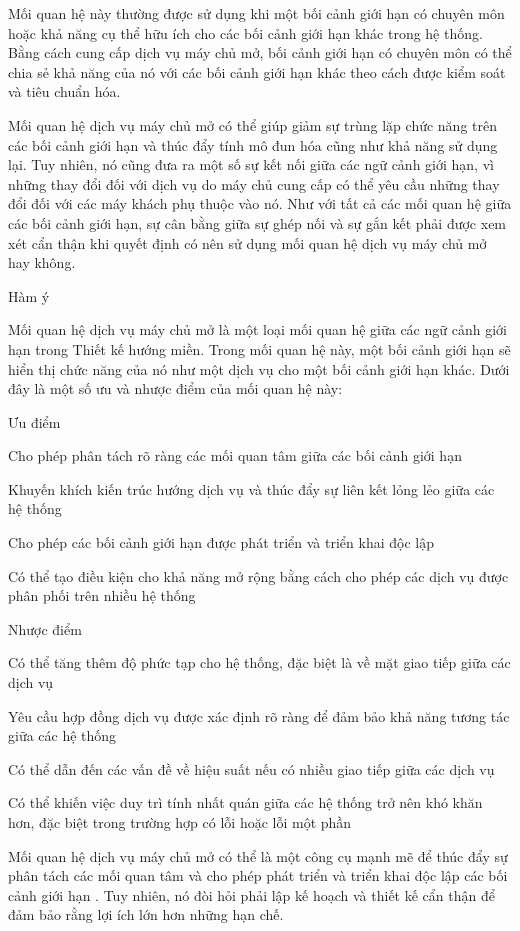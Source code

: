 Mối quan hệ này thường được sử dụng khi một bối cảnh giới hạn có chuyên môn hoặc khả năng cụ thể hữu ích cho các bối cảnh giới hạn khác trong hệ thống. Bằng cách cung cấp dịch vụ máy chủ mở, bối cảnh giới hạn có chuyên môn có thể chia sẻ khả năng của nó với các bối cảnh giới hạn khác theo cách được kiểm soát và tiêu chuẩn hóa.

Mối quan hệ dịch vụ máy chủ mở có thể giúp giảm sự trùng lặp chức năng trên các bối cảnh giới hạn và thúc đẩy tính mô đun hóa cũng như khả năng sử dụng lại. Tuy nhiên, nó cũng đưa ra một số sự kết nối giữa các ngữ cảnh giới hạn, vì những thay đổi đối với dịch vụ do máy chủ cung cấp có thể yêu cầu những thay đổi đối với các máy khách phụ thuộc vào nó. Như với tất cả các mối quan hệ giữa các bối cảnh giới hạn, sự cân bằng giữa sự ghép nối và sự gắn kết phải được xem xét cẩn thận khi quyết định có nên sử dụng mối quan hệ dịch vụ máy chủ mở hay không.

Hàm ý

Mối quan hệ dịch vụ máy chủ mở là một loại mối quan hệ giữa các ngữ cảnh giới hạn trong Thiết kế hướng miền. Trong mối quan hệ này, một bối cảnh giới hạn sẽ hiển thị chức năng của nó như một dịch vụ cho một bối cảnh giới hạn khác. Dưới đây là một số ưu và nhược điểm của mối quan hệ này:

Ưu điểm

Cho phép phân tách rõ ràng các mối quan tâm giữa các bối cảnh giới hạn

Khuyến khích kiến trúc hướng dịch vụ và thúc đẩy sự liên kết lỏng lẻo giữa các hệ thống

Cho phép các bối cảnh giới hạn được phát triển và triển khai độc lập

Có thể tạo điều kiện cho khả năng mở rộng bằng cách cho phép các dịch vụ được phân phối trên nhiều hệ thống

Nhược điểm

Có thể tăng thêm độ phức tạp cho hệ thống, đặc biệt là về mặt giao tiếp giữa các dịch vụ

Yêu cầu hợp đồng dịch vụ được xác định rõ ràng để đảm bảo khả năng tương tác giữa các hệ thống

Có thể dẫn đến các vấn đề về hiệu suất nếu có nhiều giao tiếp giữa các dịch vụ

Có thể khiến việc duy trì tính nhất quán giữa các hệ thống trở nên khó khăn hơn, đặc biệt trong trường hợp có lỗi hoặc lỗi một phần

Mối quan hệ dịch vụ máy chủ mở có thể là một công cụ mạnh mẽ để thúc đẩy sự phân tách các mối quan tâm và cho phép phát triển và triển khai độc lập các bối cảnh giới hạn . Tuy nhiên, nó đòi hỏi phải lập kế hoạch và thiết kế cẩn thận để đảm bảo rằng lợi ích lớn hơn những hạn chế.

